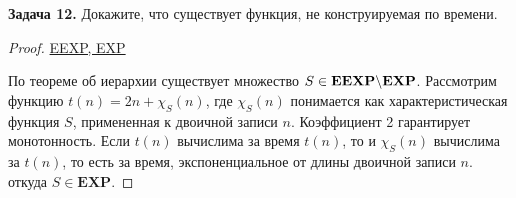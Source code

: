 \textbf{Задача 12.}
Докажите, что существует функция, не конструируемая по времени.

\begin{proof}

\href{https://complexityzoo.net/Complexity_Zoo:E#eexp}{EEXP, EXP}


По теореме об иерархии существует множество $S \in \mathbf{EEXP} \backslash \mathbf{EXP}$. Рассмотрим функцию $t(n) = 2n + \chi_S(n)$, где $\chi_S(n)$ понимается как характеристическая функция $S$, примененная к двоичной записи $n$. Коэффициент 2 гарантирует монотонность. Если $t(n)$ вычислима за время $t(n)$, то и $\chi_S(n)$ вычислима за $t(n)$, то есть за время, экспоненциальное от длины двоичной записи $n$. откуда $S \in \mathbf{EXP}$. 
\end{proof}